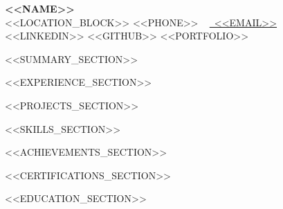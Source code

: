 \documentclass[11pt, letterpaper]{article}
\begin{document}
\begin{center}
    {\Huge \bfseries <<NAME>>} \\ \vspace{5pt}
    <<LOCATION_BLOCK>>
    \small \faPhone* <<PHONE>> ~ 
    \href{mailto:<<EMAIL>>}{\faEnvelope~<<EMAIL>>} ~ 
    <<LINKEDIN>>
    <<GITHUB>>
    <<PORTFOLIO>>
\end{center}

<<SUMMARY_SECTION>>

<<EXPERIENCE_SECTION>>

<<PROJECTS_SECTION>>

<<SKILLS_SECTION>>

<<ACHIEVEMENTS_SECTION>>

<<CERTIFICATIONS_SECTION>>

<<EDUCATION_SECTION>>
\end{document}
